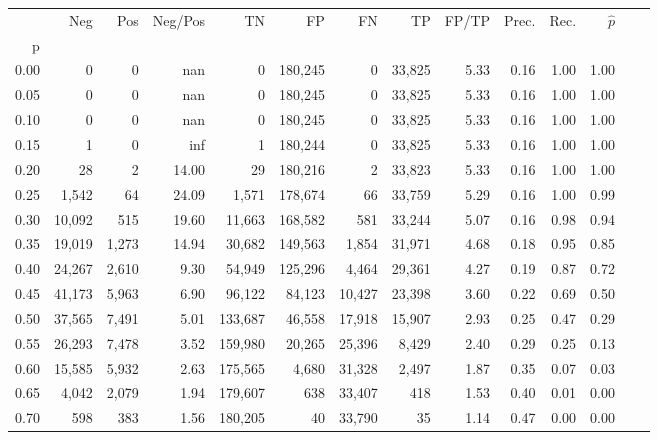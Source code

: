 \begin{tabular}{rrrrrrrrrrrrrr}
\toprule
{} &     Neg &    Pos & Neg/Pos &       TN &       FP &      FN &      TP & FP/TP & Prec. &  Rec. & $\hat{p}$ \\
p    &         &        &         &          &          &         &         &       &       &       &           \\
\midrule
0.00 &       0 &      0 &     nan &        0 &  180,245 &       0 &  33,825 &  5.33 &  0.16 &  1.00 &      1.00 \\
0.05 &       0 &      0 &     nan &        0 &  180,245 &       0 &  33,825 &  5.33 &  0.16 &  1.00 &      1.00 \\
0.10 &       0 &      0 &     nan &        0 &  180,245 &       0 &  33,825 &  5.33 &  0.16 &  1.00 &      1.00 \\
0.15 &       1 &      0 &     inf &        1 &  180,244 &       0 &  33,825 &  5.33 &  0.16 &  1.00 &      1.00 \\
0.20 &      28 &      2 &   14.00 &       29 &  180,216 &       2 &  33,823 &  5.33 &  0.16 &  1.00 &      1.00 \\
0.25 &   1,542 &     64 &   24.09 &    1,571 &  178,674 &      66 &  33,759 &  5.29 &  0.16 &  1.00 &      0.99 \\
0.30 &  10,092 &    515 &   19.60 &   11,663 &  168,582 &     581 &  33,244 &  5.07 &  0.16 &  0.98 &      0.94 \\
0.35 &  19,019 &  1,273 &   14.94 &   30,682 &  149,563 &   1,854 &  31,971 &  4.68 &  0.18 &  0.95 &      0.85 \\
0.40 &  24,267 &  2,610 &    9.30 &   54,949 &  125,296 &   4,464 &  29,361 &  4.27 &  0.19 &  0.87 &      0.72 \\
0.45 &  41,173 &  5,963 &    6.90 &   96,122 &   84,123 &  10,427 &  23,398 &  3.60 &  0.22 &  0.69 &      0.50 \\
0.50 &  37,565 &  7,491 &    5.01 &  133,687 &   46,558 &  17,918 &  15,907 &  2.93 &  0.25 &  0.47 &      0.29 \\
0.55 &  26,293 &  7,478 &    3.52 &  159,980 &   20,265 &  25,396 &   8,429 &  2.40 &  0.29 &  0.25 &      0.13 \\
0.60 &  15,585 &  5,932 &    2.63 &  175,565 &    4,680 &  31,328 &   2,497 &  1.87 &  0.35 &  0.07 &      0.03 \\
0.65 &   4,042 &  2,079 &    1.94 &  179,607 &      638 &  33,407 &     418 &  1.53 &  0.40 &  0.01 &      0.00 \\
0.70 &     598 &    383 &    1.56 &  180,205 &       40 &  33,790 &      35 &  1.14 &  0.47 &  0.00 &      0.00 \\

\end{tabular}
